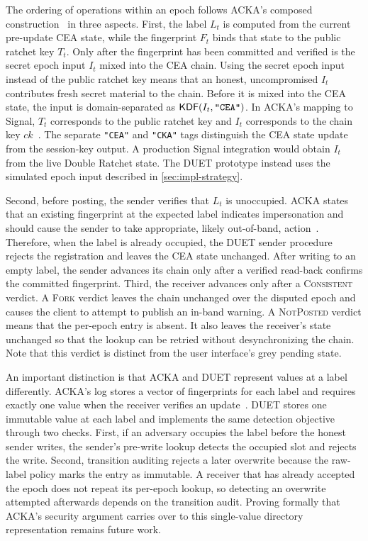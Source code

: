 The ordering of operations within an epoch follows ACKA's composed construction~\cite[Figure~8]{dowling2023acka} in three aspects. First, the label $L_t$ is computed from the
current pre-update CEA state, while the fingerprint $F_t$ binds that state to the public ratchet key
$T_t$. Only after the fingerprint has been committed and verified is the secret epoch input $I_t$
mixed into the CEA chain. Using the secret epoch input instead of the public ratchet key means that
an honest, uncompromised $I_t$ contributes fresh secret material to the chain. Before it is mixed
into the CEA state, the input is domain-separated as
$\mathsf{KDF}(I_t,\text{\texttt{"CEA"}})$. In ACKA's mapping to Signal, $T_t$ corresponds to the public
ratchet key and $I_t$ corresponds to the chain key $ck$~\cite{dowling2023acka}. The separate \texttt{"CEA"} and \texttt{"CKA"} tags distinguish
the CEA state update from the session-key output. A production Signal integration would obtain
$I_t$ from the live Double Ratchet state. The DUET prototype instead uses the simulated epoch input
described in \cref{sec:impl-strategy}.

Second, before posting, the sender verifies that $L_t$ is unoccupied. ACKA states that an existing
fingerprint at the expected label indicates impersonation and should cause the sender to take
appropriate, likely out-of-band, action~\cite{dowling2023acka}. Therefore, when the label is
already occupied, the DUET sender procedure rejects the registration and leaves the CEA state
unchanged. After writing to an empty label, the sender advances its chain only after a verified
read-back confirms the committed fingerprint. Third, the receiver advances only after a
\textsc{Consistent} verdict. A \textsc{Fork} verdict leaves the chain unchanged over the disputed
epoch and causes the client to attempt to publish an in-band warning. A \textsc{NotPosted} verdict means that the per-epoch entry
is absent. It also leaves the receiver's state unchanged so that the lookup can be retried without
desynchronizing the chain. Note that this verdict is distinct from the user interface's grey
pending state.

An important distinction is that ACKA and DUET represent values at a label differently. ACKA's log
stores a vector of fingerprints for each label and requires exactly one value when the receiver
verifies an update~\cite[Figure~8]{dowling2023acka}. DUET stores one immutable value at each label
and implements the same detection objective through two checks. First, if an adversary occupies the
label before the honest sender writes, the sender's pre-write lookup detects the occupied slot and
rejects the write. Second, transition auditing rejects a later overwrite because the raw-label
policy marks the entry as immutable. A receiver that has already accepted the epoch does not repeat
its per-epoch lookup, so detecting an overwrite attempted afterwards depends on the transition
audit. Proving formally that ACKA's security argument carries over to this single-value directory
representation remains future work.

